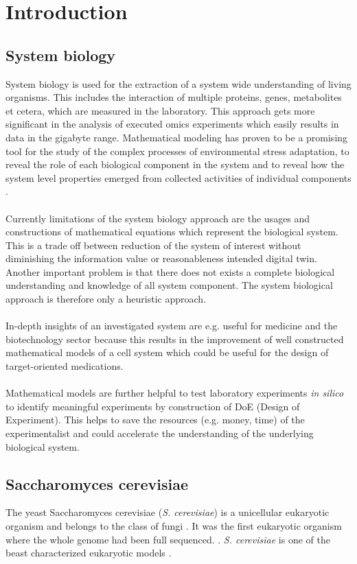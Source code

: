 \pagestyle{headings}
\section{Introduction}

\subsection{System biology}
System biology is used for the extraction of a system wide understanding of living organisms. This includes the interaction of multiple proteins, genes, metabolites et cetera, which are measured in the laboratory. This approach gets more significant in the analysis of executed omics experiments which easily results in data in the gigabyte range. Mathematical modeling has proven to be a promising tool for the study of the complex processes of environmental stress adaptation, to reveal the role of each biological component in the system and to reveal how the system level properties emerged from collected activities of individual components \cite{Ke_2013}. \\\\
Currently limitations of the system biology approach are the usages and constructions of mathematical equations which represent the biological system. This is a trade off between reduction of the system of interest without diminishing the information value or reasonableness intended digital twin. Another important problem is that there does not exists a complete biological understanding and knowledge of all system component. The system biological approach is therefore only a heuristic approach. \\\\
In-depth insights of an investigated system are e.g. useful for medicine and the biotechnology sector \cite{Ghosh2013} because this results in the improvement of well constructed mathematical models of a cell system which could be useful for the design of target-oriented medications. \\\\
Mathematical models are further helpful to test laboratory experiments \textit{in silico} to identify meaningful experiments by construction of DoE (Design of Experiment). This helps to save the resources (e.g. money, time) of the experimentalist and could accelerate the understanding of the underlying biological system.

\subsection{Saccharomyces cerevisiae}
The yeast Saccharomyces cerevisiae (\emph{S. cerevisiae}) is a unicellular eukaryotic organism and belongs to the class of fungi \cite{Feyder2015}. It was the first eukaryotic organism where the whole genome had been full sequenced. \cite{goffeau1996life}. \emph{S. cerevisiae} is one of the beast characterized eukaryotic models \cite{Feyder2015}.


